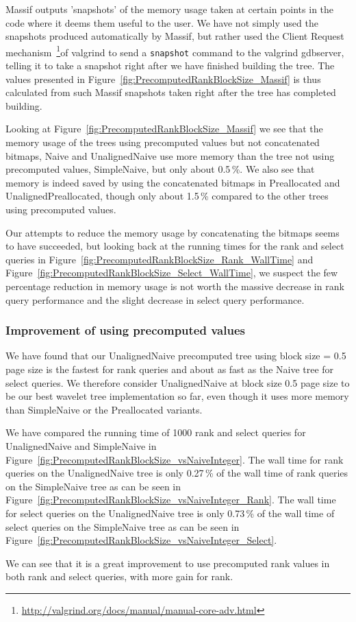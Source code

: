 Massif outputs 'snapshots' of the memory usage taken at certain points in the code where it deems them useful to the user.
We have not simply used the snapshots produced automatically by Massif, but rather used the Client Request mechanism~\footnote{\url{http://valgrind.org/docs/manual/manual-core-adv.html}}of valgrind to send a \texttt{snapshot} command to the valgrind gdbserver, telling it to take a snapshot right after we have finished building the tree.
The values presented in Figure~\ref{fig:PrecomputedRankBlockSize_Massif} is thus calculated from such Massif snapshots taken right after the tree has completed building.

Looking at Figure~\ref{fig:PrecomputedRankBlockSize_Massif} we see that the memory usage of the trees using precomputed values but not concatenated bitmaps, Naive and UnalignedNaive use more memory than the tree not using precomputed values, SimpleNaive, but only about 0.5\,\%.
We also see that memory is indeed saved by using the concatenated bitmaps in Preallocated and UnalignedPreallocated, though only about 1.5\,\% compared to the other trees using precomputed values.

Our attempts to reduce the memory usage by concatenating the bitmaps seems to have succeeded, but looking back at the running times for the rank and select queries in Figure~\ref{fig:PrecomputedRankBlockSize_Rank_WallTime} and Figure~\ref{fig:PrecomputedRankBlockSize_Select_WallTime}, we suspect the few percentage reduction in memory usage is not worth the massive decrease in rank query performance and the slight decrease in select query performance.


\subsubsection{Improvement of using precomputed values}
We have found that our UnalignedNaive precomputed tree using block size = 0.5 page size is the fastest for rank queries and about as fast as the Naive tree for select queries.
We therefore consider UnalignedNaive at block size 0.5 page size to be our best wavelet tree implementation so far, even though it uses more memory than SimpleNaive or the Preallocated variants.

We have compared the running time of 1000 rank and select queries for UnalignedNaive and SimpleNaive in Figure~\ref{fig:PrecomputedRankBlockSize_vsNaiveInteger}.
The wall time for rank queries on the UnalignedNaive tree is only 0.27\,\% of the wall time of rank queries on the SimpleNaive tree as can be seen in Figure~\ref{fig:PrecomputedRankBlockSize_vsNaiveInteger_Rank}.
The wall time for select queries on the UnalignedNaive tree is only 0.73\,\% of the wall time of select queries on the SimpleNaive tree as can be seen in Figure~\ref{fig:PrecomputedRankBlockSize_vsNaiveInteger_Select}.

We can see that it is a great improvement to use precomputed rank values in both rank and select queries, with more gain for rank.

